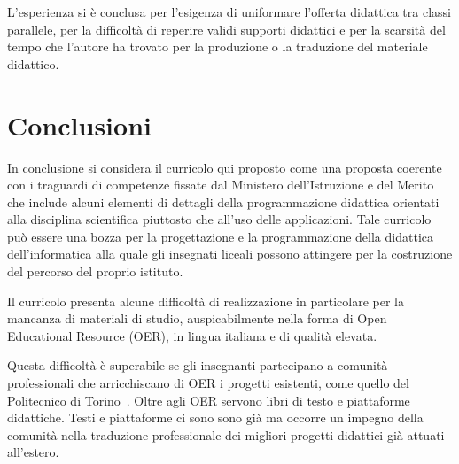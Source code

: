 \documentclass[a4paper]{easychair}
\begin{document}
L'esperienza si è conclusa per l'esigenza di uniformare l'offerta didattica tra classi parallele,
per la difficoltà di reperire validi supporti didattici e per la scarsità del tempo che l'autore
ha trovato per la produzione o la traduzione del materiale didattico.

\section{Conclusioni}

In conclusione si considera il curricolo qui proposto come
una proposta coerente con i traguardi di competenze fissate dal  
Ministero dell'Istruzione e del Merito che include alcuni elementi
di dettagli della programmazione didattica
orientati alla disciplina scientifica piuttosto che all'uso delle applicazioni.
Tale curricolo può essere una bozza per la progettazione e la programmazione
della didattica dell'informatica %
alla quale gli insegnati liceali possono attingere per la costruzione del percorso
del proprio istituto.

Il curricolo presenta alcune difficoltà di realizzazione in particolare per
la mancanza di materiali di studio, auspicabilmente nella forma di Open Educational Resource (OER),
in lingua italiana e di qualità elevata.


Questa difficoltà è superabile se gli insegnanti partecipano a comunità professionali
che arricchiscano di OER i progetti esistenti, come quello del Politecnico di Torino~\cite{fare}.
Oltre agli OER servono libri di testo e piattaforme didattiche.
Testi e piattaforme ci sono sono già ma occorre un impegno della comunità nella traduzione
professionale dei migliori progetti didattici già attuati all'estero.

\label{sect:bib}
%
%
%
\printbibliography
\end{document}
